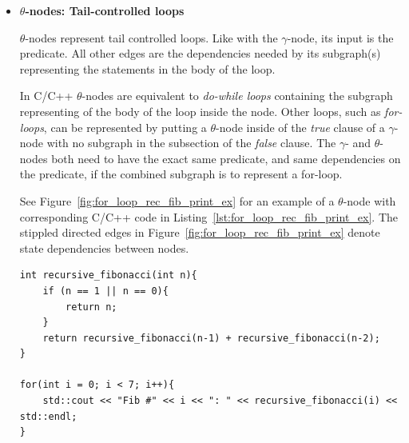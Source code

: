 \begin{itemize}
\item \textbf{$\theta$-nodes: Tail-controlled loops}

\textit{$\theta$}-nodes represent tail controlled loops. Like with the
$\gamma$-node, its input is the predicate. All other edges are the dependencies
needed by its subgraph(s) representing the statements in the body of the loop.

In C/C++ $\theta$-nodes are equivalent to \textit{do-while loops} containing the
subgraph representing of the body of the loop inside the node. Other loops, such
as \textit{for-loops}, can be represented by putting a $\theta$-node inside of
the \textit{true} clause of a $\gamma$-node with no subgraph in the subsection
of the \textit{false} clause. The $\gamma$- and $\theta$-nodes both need to have
the exact same predicate, and same dependencies on the predicate, if the
combined subgraph is to represent a for-loop.

See Figure~\ref{fig:for_loop_rec_fib_print_ex} for an example of a $\theta$-node
with corresponding C/C++ code in Listing~\ref{lst:for_loop_rec_fib_print_ex}.
The stippled directed edges in Figure~\ref{fig:for_loop_rec_fib_print_ex} denote
state dependencies between nodes.

\begin{lstlisting}[label={lst:for_loop_rec_fib_print_ex}, style=customcpp,
caption={C/C++ code corresponding to the RVSDG subgraph in
Figure~\ref{fig:for_loop_rec_fib_print_ex}.}]
int recursive_fibonacci(int n){
	if (n == 1 || n == 0){
		return n;
	}
	return recursive_fibonacci(n-1) + recursive_fibonacci(n-2);
}

for(int i = 0; i < 7; i++){
	std::cout << "Fib #" << i << ": " << recursive_fibonacci(i) << std::endl;
}
\end{lstlisting}
\vspace{-4\parskip} %
\newpage


\end{itemize}

